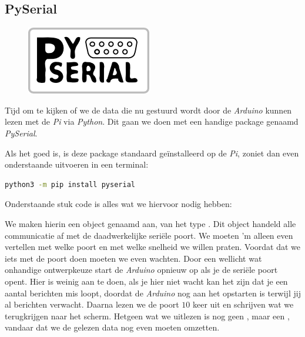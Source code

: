 \subsection{PySerial}

\begin{figure}[h!]
\centering\includegraphics[scale=0.75]{Pictures/chapter08/pyserial.png}
\label{fig:pyserial} %
\end{figure}

Tijd om te kijken of we de data die nu gestuurd wordt door de \textit{Arduino} kunnen lezen met de \textit{Pi} via \textit{Python}. Dit gaan we doen met een handige package genaamd \textit{PySerial}. 

\begin{remark}
  Als het goed is, is deze package standaard geïnstalleerd op de \textit{Pi}, zoniet dan even onderstaande uitvoeren in een terminal:
  \begin{lstlisting}[language=bash]
    python3 -m pip install pyserial
  \end{lstlisting}
\end{remark}

Onderstaande stuk code is alles wat we hiervoor nodig hebben:

We maken hierin een object genaamd  aan, van het type . Dit object handeld alle communicatie af met de daadwerkelijke seriële poort. We moeten 'm alleen even vertellen met welke poort en met welke snelheid we willen praten.
Voordat dat we iets met de poort doen moeten we even wachten. \newline 
Door een wellicht wat onhandige ontwerpkeuze start de \textit{Arduino} opnieuw op als je de seriële poort opent. Hier is weinig aan te doen, als je hier niet wacht kan het zijn dat je een aantal berichten mis loopt, doordat de \textit{Arduino} nog aan het opstarten is terwijl jij al berichten verwacht. Daarna lezen we de poort $10$ keer uit en schrijven wat we terugkrijgen naar het scherm. Hetgeen wat we uitlezen is nog geen , maar een , vandaar dat we de gelezen data nog even moeten omzetten. \newline

